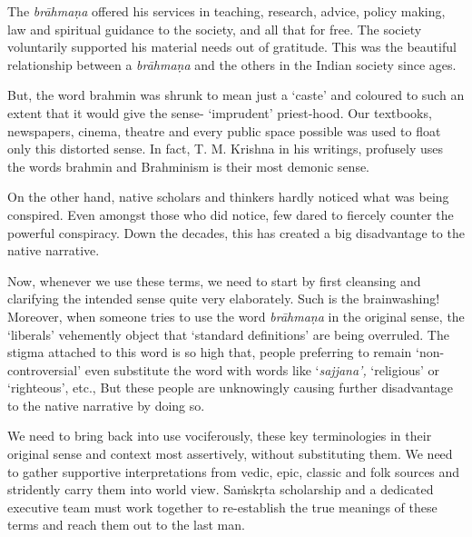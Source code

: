 The \textit{brāhmaṇa} offered his services in teaching, research, advice, policy making, law and spiritual guidance to the society, and all that for free. The society voluntarily supported his material needs out of gratitude. This was the beautiful relationship between a \textit{brāhmaṇa} and the others in the Indian society since ages.

But, the word brahmin was shrunk to mean just a ‘caste’ and coloured to such an extent that it would give the sense- ‘imprudent’ priest-hood. Our textbooks, newspapers, cinema, theatre and every public space possible was used to float only this distorted sense. In fact, T. M. Krishna in his writings, profusely uses the words brahmin and Brahminism is their most demonic sense.

On the other hand, native scholars and thinkers hardly noticed what was being conspired. Even amongst those who did notice, few dared to fiercely counter the powerful conspiracy. Down the decades, this has created a big disadvantage to the native narrative.

Now, whenever we use these terms, we need to start by first cleansing and clarifying the intended sense quite very elaborately. Such is the brainwashing! Moreover, when someone tries to use the word \textit{brāhmaṇa} in the original sense, the ‘liberals’ vehemently object that ‘standard definitions’ are being overruled. The stigma attached to this word is so high that, people preferring to remain ‘non-controversial’ even substitute the word with words like ‘\textit{sajjana’,} ‘religious’ or ‘righteous’, etc., But these people are unknowingly causing further disadvantage to the native narrative by doing so.

We need to bring back into use vociferously, these key terminologies in their original sense and context most assertively, without substituting them. We need to gather supportive interpretations from vedic, epic, classic and folk sources and stridently carry them into world view. Saṁskṛta scholarship and a dedicated executive team must work together to re-establish the true meanings of these terms and reach them out to the last man.

